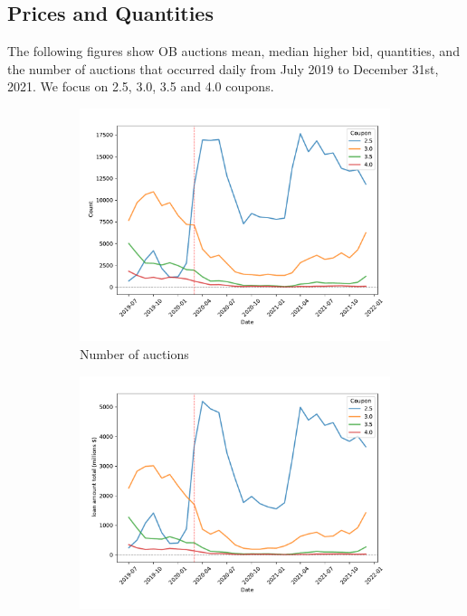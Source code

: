\documentclass[11pt,a4paper]{article}
\begin{document}
\pagebreak
\subsection{Prices and Quantities}

The following figures show OB auctions mean, median higher bid, quantities, and the number of auctions that occurred daily from July 2019 to December 31st,  2021. We focus on 2.5, 3.0, 3.5 and 4.0 coupons. 


\begin{figure}[h]
  \centering
  \begin{subfigure}[b]{0.49\textwidth}
      \includegraphics[width=0.998\textwidth]{../results/figures/winner_bid_count_mat30_loan1_timeseries_cpmonthly_2.5_4_.pdf}
      \caption{ Number of auctions}
     \end{subfigure}
     \begin{subfigure}[b]{0.49\textwidth}
      \includegraphics[width=0.998\textwidth]{../results/figures/LoanAmount_sum_mat30_loan1_timeseries_cpmonthly_2.5_4_.pdf}

\end{subfigure}
\end{figure}
\end{document}
